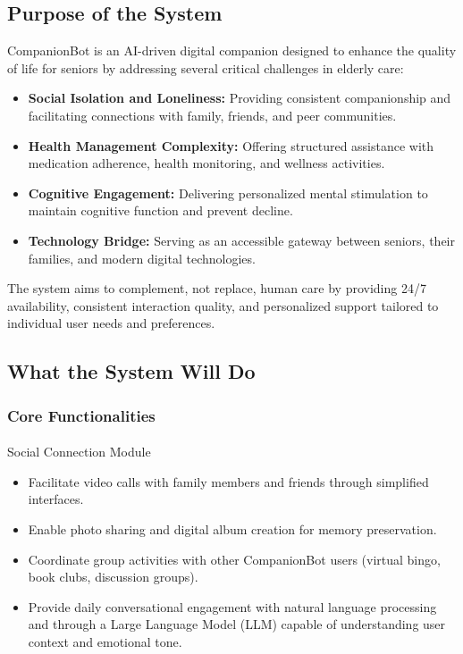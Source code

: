 \documentclass[
  letterpaper,
  DIV=11,
  numbers=noendperiod]{scrartcl}
\makeatletter
\let\oldparagraph\paragraph
\renewcommand{\paragraph}{
    \@ifstar
      \xxxParagraphStar
      \xxxParagraphNoStar
  }
\newcommand{\xxxParagraphStar}[1]{\oldparagraph*{#1}\mbox{}}
\newcommand{\xxxParagraphNoStar}[1]{\oldparagraph{#1}\mbox{}}
\providecommand{\tightlist}{%
  \setlength{\itemsep}{0pt}\setlength{\parskip}{0pt}}\usepackage{longtable,booktabs,array}
\makeatother
\begin{document}
\subsection{Purpose of the System}\label{purpose-of-the-system}

CompanionBot is an AI-driven digital companion designed to enhance the
quality of life for seniors by addressing several critical challenges in
elderly care:

\begin{itemize}
\tightlist
\item
  \textbf{Social Isolation and Loneliness:} Providing consistent
  companionship and facilitating connections with family, friends, and
  peer communities.
\item
  \textbf{Health Management Complexity:} Offering structured assistance
  with medication adherence, health monitoring, and wellness activities.
\item
  \textbf{Cognitive Engagement:} Delivering personalized mental
  stimulation to maintain cognitive function and prevent decline.
\item
  \textbf{Technology Bridge:} Serving as an accessible gateway between
  seniors, their families, and modern digital technologies.
\end{itemize}

The system aims to complement, not replace, human care by providing 24/7
availability, consistent interaction quality, and personalized support
tailored to individual user needs and preferences.

\subsection{What the System Will Do}\label{what-the-system-will-do}

\subsubsection{Core Functionalities}\label{core-functionalities}

\paragraph{Social Connection Module}\label{social-connection-module}

\begin{itemize}
\tightlist
\item
  Facilitate video calls with family members and friends through
  simplified interfaces.
\item
  Enable photo sharing and digital album creation for memory
  preservation.
\item
  Coordinate group activities with other CompanionBot users (virtual
  bingo, book clubs, discussion groups).
\item
  Provide daily conversational engagement with natural language
  processing and through a Large Language Model (LLM) capable of
  understanding user context and emotional tone.
\end{itemize}
\end{document}

